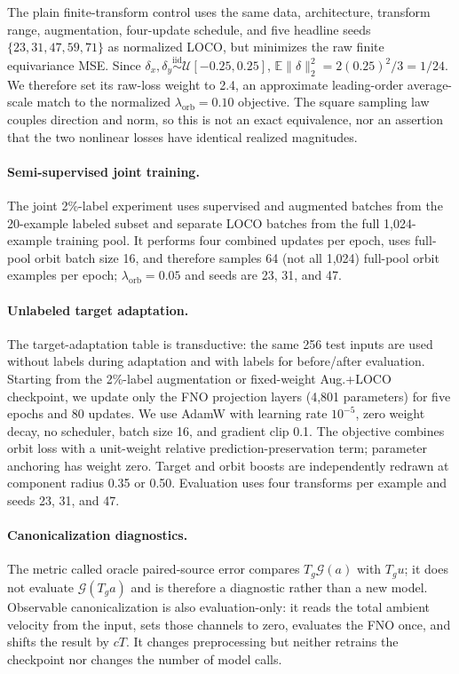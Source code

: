 The plain finite-transform control uses the same data, architecture, transform
range, augmentation, four-update schedule, and five headline seeds
\(\{23,31,47,59,71\}\) as normalized LOCO, but minimizes the raw finite
equivariance MSE.  Since
\(\delta_x,\delta_y\stackrel{\mathrm{iid}}{\sim}\mathcal U[-0.25,0.25]\),
\(\mathbb E\lVert\delta\rVert_2^2=2(0.25)^2/3=1/24\).  We therefore set its
raw-loss weight to 2.4, an approximate leading-order average-scale match to the
normalized \(\lambda_{\mathrm{orb}}=0.10\) objective.  The square sampling law
couples direction and norm, so this is not an exact equivalence, nor an assertion
that the two nonlinear losses have identical realized magnitudes.

\paragraph{Semi-supervised joint training.}
The joint 2\%-label experiment uses supervised and augmented batches from the
20-example labeled subset and separate LOCO batches from the full 1,024-example
training pool.  It performs four combined updates per epoch, uses full-pool orbit
batch size 16, and therefore samples 64 (not all 1,024) full-pool orbit examples per
epoch; \(\lambda_{\mathrm{orb}}=0.05\) and seeds are 23, 31, and 47.

\paragraph{Unlabeled target adaptation.}
The target-adaptation table is transductive: the same 256 test inputs are used without
labels during adaptation and with labels for before/after evaluation.  Starting from
the 2\%-label augmentation or fixed-weight Aug.+LOCO checkpoint, we update only the
FNO projection layers (4,801 parameters) for five epochs and 80 updates.  We use
AdamW with learning rate \(10^{-5}\), zero weight decay, no scheduler, batch size 16,
and gradient clip 0.1.  The objective combines orbit loss with a unit-weight relative
prediction-preservation term; parameter anchoring has weight zero.  Target and orbit
boosts are independently redrawn at component radius 0.35 or 0.50.  Evaluation uses
four transforms per example and seeds 23, 31, and 47.

\paragraph{Canonicalization diagnostics.}
The metric called oracle paired-source error compares
\(T_g\mathcal G(a)\) with \(T_gu\); it does not evaluate
\(\mathcal G(T_ga)\) and is therefore a diagnostic rather than a new model.
Observable canonicalization is also evaluation-only: it reads the total ambient
velocity from the input, sets those channels to zero, evaluates the FNO once, and
shifts the result by \(cT\).  It changes preprocessing but neither retrains the
checkpoint nor changes the number of model calls.
